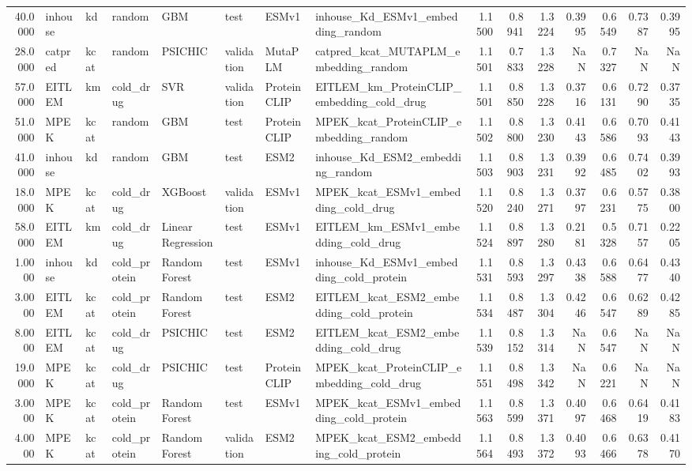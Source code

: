 \begin{tabular}{rlllllllrrrrrrr}
40.0000 & inhouse & kd & random & GBM & test & ESMv1 & inhouse_Kd_ESMv1_embedding_random & 1.1500 & 0.8941 & 1.3224 & 0.3995 & 0.6549 & 0.7387 & 0.3995 \\
28.0000 & catpred & kcat & random & PSICHIC & validation & MutaPLM & catpred_kcat_MUTAPLM_embedding_random & 1.1501 & 0.7833 & 1.3228 & NaN & 0.7327 & NaN & NaN \\
57.0000 & EITLEM & km & cold_drug & SVR & validation & ProteinCLIP & EITLEM_km_ProteinCLIP_embedding_cold_drug & 1.1501 & 0.8850 & 1.3228 & 0.3716 & 0.6131 & 0.7290 & 0.3735 \\
51.0000 & MPEK & kcat & random & GBM & test & ProteinCLIP & MPEK_kcat_ProteinCLIP_embedding_random & 1.1502 & 0.8800 & 1.3230 & 0.4143 & 0.6586 & 0.7093 & 0.4143 \\
41.0000 & inhouse & kd & random & GBM & test & ESM2 & inhouse_Kd_ESM2_embedding_random & 1.1503 & 0.8903 & 1.3231 & 0.3992 & 0.6485 & 0.7402 & 0.3993 \\
18.0000 & MPEK & kcat & cold_drug & XGBoost & validation & ESMv1 & MPEK_kcat_ESMv1_embedding_cold_drug & 1.1520 & 0.8240 & 1.3271 & 0.3797 & 0.6231 & 0.5775 & 0.3800 \\
58.0000 & EITLEM & km & cold_drug & Linear Regression & test & ESMv1 & EITLEM_km_ESMv1_embedding_cold_drug & 1.1524 & 0.8897 & 1.3280 & 0.2181 & 0.5328 & 0.7157 & 0.2205 \\
1.0000 & inhouse & kd & cold_protein & Random Forest & test & ESMv1 & inhouse_Kd_ESMv1_embedding_cold_protein & 1.1531 & 0.8593 & 1.3297 & 0.4338 & 0.6588 & 0.6477 & 0.4340 \\
3.0000 & EITLEM & kcat & cold_protein & Random Forest & test & ESM2 & EITLEM_kcat_ESM2_embedding_cold_protein & 1.1534 & 0.8487 & 1.3304 & 0.4246 & 0.6547 & 0.6289 & 0.4285 \\
8.0000 & EITLEM & kcat & cold_drug & PSICHIC & test & ESM2 & EITLEM_kcat_ESM2_embedding_cold_drug & 1.1539 & 0.8152 & 1.3314 & NaN & 0.6547 & NaN & NaN \\
19.0000 & MPEK & kcat & cold_drug & PSICHIC & test & ProteinCLIP & MPEK_kcat_ProteinCLIP_embedding_cold_drug & 1.1551 & 0.8498 & 1.3342 & NaN & 0.6221 & NaN & NaN \\
3.0000 & MPEK & kcat & cold_protein & Random Forest & test & ESMv1 & MPEK_kcat_ESMv1_embedding_cold_protein & 1.1563 & 0.8599 & 1.3371 & 0.4097 & 0.6468 & 0.6419 & 0.4183 \\
4.0000 & MPEK & kcat & cold_protein & Random Forest & validation & ESM2 & MPEK_kcat_ESM2_embedding_cold_protein & 1.1564 & 0.8493 & 1.3372 & 0.4093 & 0.6466 & 0.6378 & 0.4170 \\

\end{tabular}
